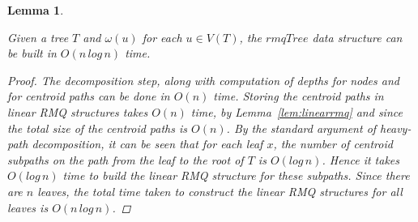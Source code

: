 \documentclass{article}
\newcommand{\weight}{\omega}
\newtheorem{rmqdatastructure}[incompatibility]{Lemma}
\begin{document}
    \begin{rmqdatastructure}
        \label{lem:rmqdatastructure}

        Given a tree $T$ and $\weight(u)$ for each $u \in V(T)$, the $rmqTree$ data structure can be built in $O(n\,log\,n)$ time.

        \begin{proof}
            The decomposition step, along with computation of depths for nodes and for centroid paths can be done in $O(n)$ time. Storing the centroid paths in linear RMQ structures takes $O(n)$ time, by Lemma~\ref{lem:linearrmq} and since the total size of the centroid paths is $O(n)$. By the standard argument of heavy-path decomposition, it can be seen that for each leaf $x$, the number of centroid subpaths on the path from the leaf to the root of $T$ is $O(log\,n)$. Hence it takes $O(log\,n)$ time to build the linear RMQ structure for these subpaths. Since there are $n$ leaves, the total time taken to construct the linear RMQ structures for all leaves is $O(n\,log\,n)$.
        \end{proof}
    \end{rmqdatastructure}
\end{document}
